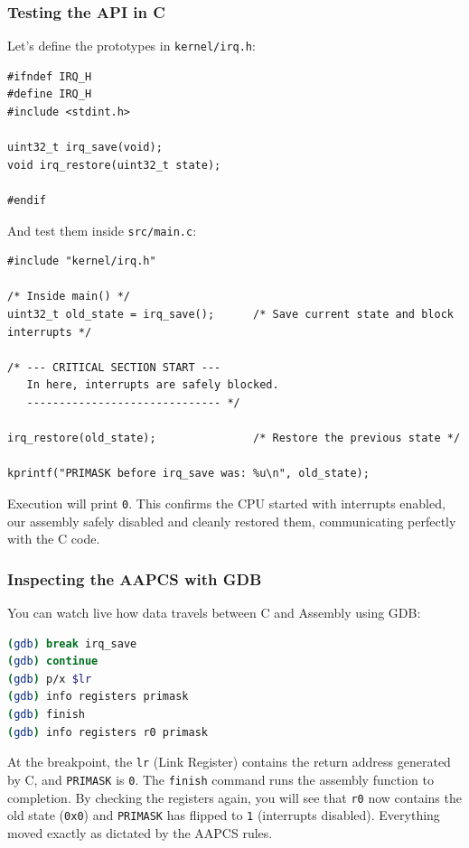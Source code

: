 \subsubsection{Testing the API in C}
Let's define the prototypes in \texttt{kernel/irq.h}:

\begin{lstlisting}
#ifndef IRQ_H
#define IRQ_H
#include <stdint.h>

uint32_t irq_save(void);
void irq_restore(uint32_t state);

#endif
\end{lstlisting}

And test them inside \texttt{src/main.c}:

\begin{lstlisting}
#include "kernel/irq.h"

/* Inside main() */
uint32_t old_state = irq_save();      /* Save current state and block interrupts */

/* --- CRITICAL SECTION START ---
   In here, interrupts are safely blocked.
   ------------------------------ */

irq_restore(old_state);               /* Restore the previous state */

kprintf("PRIMASK before irq_save was: %u\n", old_state);
\end{lstlisting}

Execution will print \texttt{0}. This confirms the CPU started with interrupts enabled, our assembly safely disabled and cleanly restored them, communicating perfectly with the C code.

\subsubsection{Inspecting the AAPCS with GDB}
You can watch live how data travels between C and Assembly using GDB:
\begin{lstlisting}[language=bash]
(gdb) break irq_save
(gdb) continue
(gdb) p/x $lr
(gdb) info registers primask
(gdb) finish
(gdb) info registers r0 primask
\end{lstlisting}

At the breakpoint, the \texttt{lr} (Link Register) contains the return address generated by C, and \texttt{PRIMASK} is \texttt{0}. The \texttt{finish} command runs the assembly function to completion. By checking the registers again, you will see that \texttt{r0} now contains the old state (\texttt{0x0}) and \texttt{PRIMASK} has flipped to \texttt{1} (interrupts disabled). Everything moved exactly as dictated by the AAPCS rules.

